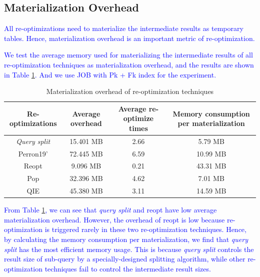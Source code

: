 \subsection{Materialization Overhead} \label{S55}
\textcolor{blue}{
    All re-optimizations need to materialize the intermediate results as temporary tables. Hence, materialization overhead is an important metric of re-optimization.
}\par
\textcolor{blue}{
    We test the average memory used for materializing the intermediate results of all re-optimization techniques as materialization overhead, and the results are shown in Table \ref{T4}. And we use JOB with Pk + Fk index for the experiment.
}
    \begin{table}[htb]
        \caption{Materialization overhead of re-optimization techniques}
        \label{T4}
        \begin{tabular}{c|c|c|c}
            \toprule
            Re-optimizations       &  Average overhead & Average re-optimize times & Memory consumption per materialization \\
            \midrule
            \textit{Query split}   &     15.401 MB     &            2.66           &  5.79 MB \\
            Perron19'              &     72.445 MB     &            6.59           & 10.99 MB \\
            Reopt                  &      9.096 MB     &            0.21           & 43.31 MB \\
            Pop                    &     32.396 MB     &            4.62           &  7.01 MB \\
            QIE                    &     45.380 MB     &            3.11           & 14.59 MB \\
            \bottomrule
        \end{tabular}
    \end{table}\par
\textcolor{blue}{
    From Table \ref{T4}, we can see that \textit{query split} and reopt have low average materialization overhead. However, the overhead of reopt is low because re-optimization is triggered rarely in these two re-optimization techniques. Hence, by calculating the memory consumption per materialization, we find that \textit{query split} has the most efficient memory usage. This is because \textit{query split} controls the result size of sub-query by a specially-designed splitting algorithm, while other re-optimization techniques fail to control the intermediate result sizes.
}


